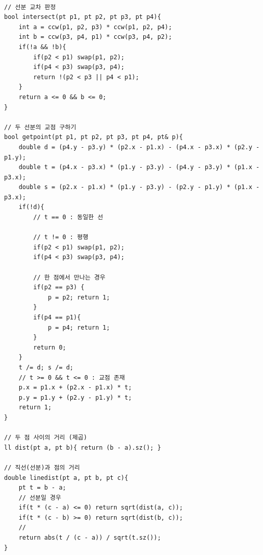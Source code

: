 \documentclass[landscape, 8pt, a4paper, oneside, twocolumn]{extarticle}
\begin{document}
\begin{verbatim}

// 선분 교차 판정
bool intersect(pt p1, pt p2, pt p3, pt p4){
    int a = ccw(p1, p2, p3) * ccw(p1, p2, p4);
    int b = ccw(p3, p4, p1) * ccw(p3, p4, p2);
    if(!a && !b){
        if(p2 < p1) swap(p1, p2);
        if(p4 < p3) swap(p3, p4);
        return !(p2 < p3 || p4 < p1);
    }
    return a <= 0 && b <= 0;
}

// 두 선분의 교점 구하기
bool getpoint(pt p1, pt p2, pt p3, pt p4, pt& p){
    double d = (p4.y - p3.y) * (p2.x - p1.x) - (p4.x - p3.x) * (p2.y - p1.y);
    double t = (p4.x - p3.x) * (p1.y - p3.y) - (p4.y - p3.y) * (p1.x - p3.x);
    double s = (p2.x - p1.x) * (p1.y - p3.y) - (p2.y - p1.y) * (p1.x - p3.x);
    if(!d){
        // t == 0 : 동일한 선
        
        // t != 0 : 평행
        if(p2 < p1) swap(p1, p2);
        if(p4 < p3) swap(p3, p4);
        
        // 한 점에서 만나는 경우
        if(p2 == p3) {
            p = p2; return 1;
        }    
        if(p4 == p1){
            p = p4; return 1;
        }
        return 0;
    }
    t /= d; s /= d;
    // t >= 0 && t <= 0 : 교점 존재
    p.x = p1.x + (p2.x - p1.x) * t;
    p.y = p1.y + (p2.y - p1.y) * t;
    return 1;
}

// 두 점 사이의 거리 (제곱)
ll dist(pt a, pt b){ return (b - a).sz(); }

// 직선(선분)과 점의 거리
double linedist(pt a, pt b, pt c){
    pt t = b - a;
    // 선분일 경우
    if(t * (c - a) <= 0) return sqrt(dist(a, c));
    if(t * (c - b) >= 0) return sqrt(dist(b, c));
    //   
    return abs(t / (c - a)) / sqrt(t.sz());
}


\end{verbatim}
\end{document}
